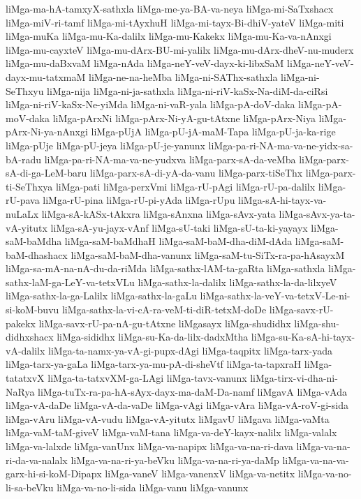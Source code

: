 {liMga-ma-hA-tamxyX-sathxla
liMga-me-ya-BA-va-neya
liMga-mi-SaTxshacx
liMga-miV-ri-tamf
liMga-mi-tAyxhuH
liMga-mi-tayx-Bi-dhiV-yateV
liMga-miti
liMga-muKa
liMga-mu-Ka-dalilx
liMga-mu-Kakekx
liMga-mu-Ka-va-nAnxgi
liMga-mu-cayxteV
liMga-mu-dArx-BU-mi-yalilx
liMga-mu-dArx-dheV-nu-muderx
liMga-mu-daBxvaM
liMga-nAda
liMga-neY-veV-dayx-ki-libxSaM
liMga-neY-veV-dayx-mu-tatxmaM
liMga-ne-na-heMba
liMga-ni-SAThx-sathxla
liMga-ni-SeThxyu
liMga-nija
liMga-ni-ja-sathxla
liMga-ni-riV-kaSx-Na-diM-da-ciRsi
liMga-ni-riV-kaSx-Ne-yiMda
liMga-ni-vaR-yala
liMga-pA-doV-daka
liMga-pA-moV-daka
liMga-pArxNi
liMga-pArx-Ni-yA-gu-tAtxne
liMga-pArx-Niya
liMga-pArx-Ni-ya-nAnxgi
liMga-pUjA
liMga-pU-jA-maM-Tapa
liMga-pU-ja-ka-rige
liMga-pUje
liMga-pU-jeya
liMga-pU-je-yanunx
liMga-pa-ri-NA-ma-va-ne-yidx-sa-bA-radu
liMga-pa-ri-NA-ma-va-ne-yudxva
liMga-parx-sA-da-veMba
liMga-parx-sA-di-ga-LeM-baru
liMga-parx-sA-di-yA-da-vanu
liMga-parx-tiSeThx
liMga-parx-ti-SeThxya
liMga-pati
liMga-perxVmi
liMga-rU-pAgi
liMga-rU-pa-dalilx
liMga-rU-pava
liMga-rU-pina
liMga-rU-pi-yAda
liMga-rUpu
liMga-sA-hi-tayx-va-nuLaLx
liMga-sA-kASx-tAkxra
liMga-sAnxna
liMga-sAvx-yata
liMga-sAvx-ya-ta-vA-yitutx
liMga-sA-yu-jayx-vAnf
liMga-sU-taki
liMga-sU-ta-ki-yayayx
liMga-saM-baMdha
liMga-saM-baMdhaH
liMga-saM-baM-dha-diM-dAda
liMga-saM-baM-dhashacx
liMga-saM-baM-dha-vanunx
liMga-saM-tu-SiTx-ra-pa-hAsayxM
liMga-sa-mA-na-nA-du-da-riMda
liMga-sathx-lAM-ta-gaRta
liMga-sathxla
liMga-sathx-laM-ga-LeY-va-tetxVLu
liMga-sathx-la-dalilx
liMga-sathx-la-da-lilxyeV
liMga-sathx-la-ga-Lalilx
liMga-sathx-la-gaLu
liMga-sathx-la-veY-va-tetxV-Le-ni-si-koM-buvu
liMga-sathx-la-vi-cA-ra-veM-ti-diR-tetxM-doDe
liMga-savx-rU-pakekx
liMga-savx-rU-pa-nA-gu-tAtxne
liMgasayx
liMga-shudidhx
liMga-shu-didhxshacx
liMga-sididhx
liMga-su-Ka-da-lilx-dadxMtha
liMga-su-Ka-sA-hi-tayx-vA-dalilx
liMga-ta-namx-ya-vA-gi-pupx-dAgi
liMga-taqpitx
liMga-tarx-yada
liMga-tarx-ya-gaLa
liMga-tarx-ya-mu-pA-di-sheVtf
liMga-ta-tapxraH
liMga-tatatxvX
liMga-ta-tatxvXM-ga-LAgi
liMga-tavx-vanunx
liMga-tirx-vi-dha-ni-NaRya
liMga-tuTx-ra-pa-hA-sAyx-dayx-ma-daM-Da-namf
liMgavA
liMga-vAda
liMga-vA-daDe
liMga-vA-da-vaDe
liMga-vAgi
liMga-vAra
liMga-vA-roV-gi-sida
liMga-vAru
liMga-vA-vudu
liMga-vA-yitutx
liMgavU
liMgava
liMga-vaMta
liMga-vaM-taM-giveV
liMga-vaM-tana
liMga-va-deY-kayx-nalilx
liMga-valalx
liMga-va-lalxde
liMga-vanUnx
liMga-va-napipx
liMga-va-na-ri-dava
liMga-va-na-ri-da-va-nalalx
liMga-va-na-ri-ya-beVku
liMga-va-na-ri-ya-daMp
liMga-va-na-va-garx-hi-si-koM-Dipapx
liMga-vaneV
liMga-vanenxV
liMga-va-netitx
liMga-va-no-li-sa-beVku
liMga-va-no-li-sida
liMga-vanu
liMga-vanunx
}
